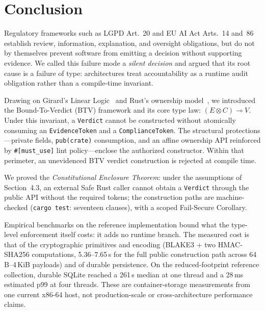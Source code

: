 
\section{Conclusion}
\label{sec:conclusion}

Regulatory frameworks
such as LGPD Art.~20 and EU AI Act Arts.~14 and~86 establish review,
information, explanation, and oversight obligations, but do not by
themselves prevent software from emitting a decision without supporting
evidence.
We called this failure mode a \emph{silent decision} and argued that
its root cause is a failure of type: architectures treat
accountability as a runtime audit obligation rather than a
compile-time invariant.

Drawing on Girard's Linear Logic~\cite{girard1987linear} and Rust's
ownership model~\cite{jung2017rustbelt}, we introduced the
Bound-To-Verdict (BTV) framework and its core type law:
$(E \otimes C) \multimap V$.
Under this invariant, a \texttt{Verdict} cannot be constructed
without atomically consuming an \texttt{EvidenceToken} and a
\texttt{ComplianceToken}.
The structural protections---private fields, \texttt{pub(crate)}
consumption, and an affine ownership API reinforced by
\texttt{\#[must\_use]} lint policy---enclose the authorized constructor.
Within that perimeter, an unevidenced BTV verdict construction is rejected
at compile time.

We proved the \emph{Constitutional Enclosure Theorem}: under the
assumptions of Section~4.3, an external Safe Rust caller cannot obtain
a \texttt{Verdict} through the public API without the required
tokens; the construction paths are machine-checked
(\texttt{cargo test}: seventeen clauses), with a scoped
Fail-Secure Corollary.

Empirical benchmarks on the reference implementation bound what the
type-level enforcement itself costs: it adds no runtime branch.  The
measured cost is that of the cryptographic primitives and encoding
(BLAKE3 + two HMAC-SHA256 computations, 5.36--7.65\,\textmu s for the
full public construction path across 64\,B--4\,KiB payloads) and of durable
persistence.  On the reduced-footprint reference collection, durable SQLite
reached a 261\,\textmu s median at one thread and a 28\,ms estimated p99 at
four threads.  These are container-storage measurements from one current
x86-64 host, not production-scale or cross-architecture performance claims.

